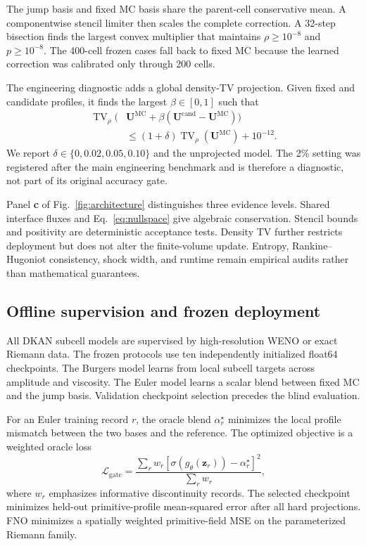 \documentclass[10pt,twocolumn]{article}
\begin{document}
The jump basis and fixed MC basis share the parent-cell conservative mean. A componentwise stencil limiter then scales the complete correction. A 32-step bisection finds the largest convex multiplier that maintains $\rho\ge10^{-8}$ and $p\ge10^{-8}$. The 400-cell frozen cases fall back to fixed MC because the learned correction was calibrated only through 200 cells.

The engineering diagnostic adds a global density-TV projection. Given fixed and candidate profiles, it finds the largest $\beta\in[0,1]$ such that
\begin{equation}
 \begin{aligned}
 \operatorname{TV}_{\rho}\!\bigl(&\bm U^{\mathrm{MC}}+
 \beta(\bm U^{\mathrm{cand}}-\bm U^{\mathrm{MC}})\bigr)\\
 &\le (1+\delta)\operatorname{TV}_{\rho}(\bm U^{\mathrm{MC}})+10^{-12}.
 \end{aligned}
 \label{eq:tvprojection}
\end{equation}
We report $\delta\in\{0,0.02,0.05,0.10\}$ and the unprojected model. The 2\% setting was registered after the main engineering benchmark and is therefore a diagnostic, not part of its original accuracy gate.

Panel \textbf{c} of Fig.~\ref{fig:architecture} distinguishes three evidence levels. Shared interface fluxes and Eq.~\eqref{eq:nullspace} give algebraic conservation. Stencil bounds and positivity are deterministic acceptance tests. Density TV further restricts deployment but does not alter the finite-volume update. Entropy, Rankine--Hugoniot consistency, shock width, and runtime remain empirical audits rather than mathematical guarantees.

\subsection{Offline supervision and frozen deployment}

All DKAN subcell models are supervised by high-resolution WENO or exact Riemann data. The frozen protocols use ten independently initialized float64 checkpoints. The Burgers model learns from local subcell targets across amplitude and viscosity. The Euler model learns a scalar blend between fixed MC and the jump basis. Validation checkpoint selection precedes the blind evaluation.

For an Euler training record $r$, the oracle blend $\alpha_r^\star$ minimizes the local profile mismatch between the two bases and the reference. The optimized objective is a weighted oracle loss
\begin{equation}
 \mathcal L_{\mathrm{gate}}=
 \frac{\sum_r w_r\left[\sigma(g_\theta(\bm z_r))-\alpha_r^\star\right]^2}
 {\sum_r w_r},
 \label{eq:gateloss}
\end{equation}
where $w_r$ emphasizes informative discontinuity records. The selected checkpoint minimizes held-out primitive-profile mean-squared error after all hard projections. FNO minimizes a spatially weighted primitive-field MSE on the parameterized Riemann family.
\end{document}
